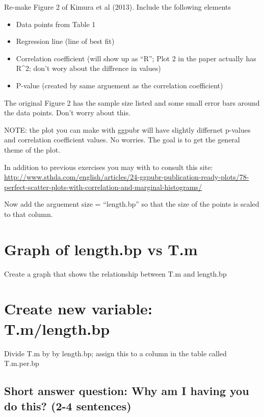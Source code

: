 \documentclass[
]{book}
\providecommand{\tightlist}{%
  \setlength{\itemsep}{0pt}\setlength{\parskip}{0pt}}
\begin{document}
Re-make Figure 2 of Kimura et al (2013). Include the following elements

\begin{itemize}
\tightlist
\item
  Data points from Table 1
\item
  Regression line (line of best fit)
\item
  Correlation coefficient (will show up as ``R''; Plot 2 in the paper actually has R\^{}2; don't wory about the diffrence in values)
\item
  P-value (created by same arguement as the correlation coefficient)
\end{itemize}

The original Figure 2 has the sample size listed and some small error bars around the data points. Don't worry about this.

NOTE: the plot you can make with ggpubr will have slightly differnet p-values and correlation coefficient values. No worries. The goal is to get the general theme of the plot.

In addition to previous exercises you may with to consult this site:
\url{http://www.sthda.com/english/articles/24-ggpubr-publication-ready-plots/78-perfect-scatter-plots-with-correlation-and-marginal-histograms/}

Now add the arguement size = ``length.bp'' so that the size of the points is scaled to that column.

\hypertarget{graph-of-length.bp-vs-t.m}{%
\section{Graph of length.bp vs T.m}\label{graph-of-length.bp-vs-t.m}}

Create a graph that shows the relationship between T.m and length.bp

\hypertarget{create-new-variable-t.mlength.bp-1}{%
\section{Create new variable: T.m/length.bp}\label{create-new-variable-t.mlength.bp-1}}

Divide T.m by by length.bp; assign this to a column in the table called T.m.per.bp

\hypertarget{short-answer-question-why-am-i-having-you-do-this-2-4-sentences}{%
\subsection{Short answer question: Why am I having you do this? (2-4 sentences)}\label{short-answer-question-why-am-i-having-you-do-this-2-4-sentences}}
\end{document}
